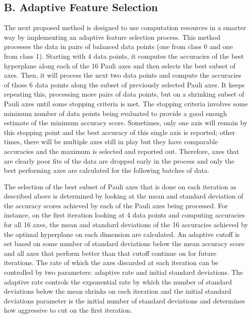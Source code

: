 \documentclass[
	a4paper, %
	10pt, %
	unnumberedsections, %
	twoside, %
]{LTJournalArticle}
\begin{document}
\subsection{B. Adaptive Feature Selection}
The next proposed method is designed to use computation resources in a smarter way by implementing an adaptive feature selection process. This method processes the data in pairs of balanced 
data points (one from class 0 and one from class 1). Starting with 4 data points, it computes the accuracies of the best hyperplane along each of the 16 Pauli axes and then selects the 
best subset of axes. Then, it will process the next two data points and compute the accuracies of those 6 data points along the subset of previously selected Pauli axes. It keeps repeating 
this, processing more pairs of data points, but on a shrinking subset of Pauli axes until some stopping criteria is met. The stopping criteria involves some minimum number of data points 
being evaluated to provide a good enough estimate of the minimum accuracy score. Sometimes, only one axis will remain by this stopping point and the best accuracy of this single axis is 
reported; other times, there will be multiple axes still in play but they have comparable accuracies and the maximum is selected and reported out. Therefore, axes that are clearly poor 
fits of the data are dropped early in the process and only the best performing axes are calculated for the following batches of data.

The selection of the best subset of Pauli axes that is done on each iteration as described above is determined by looking at the mean and standard deviation of the accuracy scores achieved by 
each of the Pauli axes being processed. For instance, on the first iteration looking at 4 data points and computing accuracies for all 16 axes, the mean and standard deviations of the 16 
accuracies achieved by the optimal hyperplane on each dimension are calculated. An adaptive cutoff is set based on some number of standard deviations below the mean accuracy score and all 
axes that perform better than that cutoff continue on for future iterations. The rate of which the axes discarded at each iteration can be controlled by two parameters: adaptive rate and 
initial standard deviations. The adaptive rate controls the exponential rate by which the number of standard deviations below the mean shrinks on each iteration and the initial standard 
deviations parameter is the initial number of standard deviations and determines how aggressive to cut on the first iteration.
\end{document}
